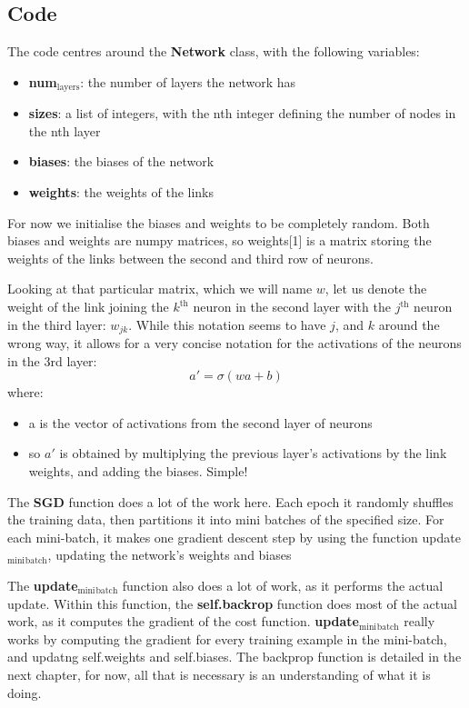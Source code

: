 \documentclass[11pt]{article}
\begin{document}
\subsection{Code}
\label{sec:org0eefeae}
The code centres around the \textbf{Network} class, with the following variables:
\begin{itemize}
\item \textbf{num\(_{\text{layers}}\)}: the number of layers the network has
\item \textbf{sizes}: a list of integers, with the nth integer defining the number of nodes in the nth layer
\item \textbf{biases}: the biases of the network
\item \textbf{weights}: the weights of the links
\end{itemize}
For now we initialise the biases and weights to be completely random. Both biases and weights are numpy matrices, so weights[1] is a matrix storing the weights of the links between the second and third row of neurons. 

Looking at that particular matrix, which we will name \(w\), let us denote the weight of the link joining the \(k^{\text{th}}\) neuron in the second layer with the \(j^{\text{th}}\) neuron in the third layer: \(w_{jk}\). While this notation seems to have \(j\), and \(k\) around the wrong way, it allows for a very concise notation for the activations of the neurons in the 3rd layer:
\begin{equation} \label{eqn:activation}
a' = \sigma ( wa+b )
\end{equation}
where:
\begin{itemize}
\item a is the vector of activations from the second layer of neurons
\item so \(a'\) is obtained by multiplying the previous layer's activations by the link weights, and adding the biases. Simple!
\end{itemize}

The \textbf{SGD} function does a lot of the work here. Each epoch it randomly shuffles the training data, then partitions it into mini batches of the specified size. For each mini-batch, it makes one gradient descent step by using the function update\(_{\text{mini}}\)\(_{\text{batch}}\), updating the network's weights and biases

The \textbf{update\(_{\text{mini}}\)\(_{\text{batch}}\)} function also does a lot of work, as it performs the actual update. Within this function, the \textbf{self.backrop} function does most of the actual work, as it computes the gradient of the cost function. \textbf{update\(_{\text{mini}}\)\(_{\text{batch}}\)} really works by computing the gradient for every training example in the mini-batch, and updatng self.weights and self.biases. The backprop function is detailed in the next chapter, for now, all that is necessary is an understanding of what it is doing.
\end{document}
